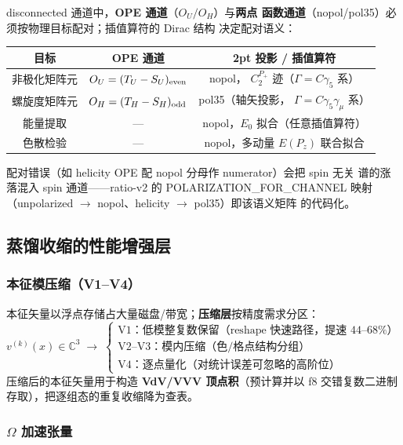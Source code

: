 \documentclass[11pt,a4paper]{ctexart}
\begin{document}
disconnected 通道中，\textbf{OPE 通道}（$O_U/O_H$）与\textbf{两点
函数通道}（nopol/pol35）必须按物理目标配对；插值算符的 Dirac 结构
决定配对语义：
\begin{center}
\small
\begin{tabular}{c c c}
\toprule
\textbf{目标} & \textbf{OPE 通道} & \textbf{2pt 投影 / 插值算符} \\
\midrule
非极化矩阵元 & $O_U=(T_U-S_U)_{\rm even}$ & nopol，
$C_2^{P_+}$ 迹（$\Gamma=C\gamma_5$ 系） \\
螺旋度矩阵元 & $O_H=(T_H-S_H)_{\rm odd}$ & pol35（轴矢投影，
$\Gamma=C\gamma_5\gamma_\mu$ 系） \\
能量提取 & --- & nopol，$E_0$ 拟合（任意插值算符） \\
色散检验 & --- & nopol，多动量 $E(P_z)$ 联合拟合 \\
\bottomrule
\end{tabular}
\end{center}
配对错误（如 helicity OPE 配 nopol 分母作 numerator）会把 spin 无关
谱的涨落混入 spin 通道——ratio-v2 的 POLARIZATION\_FOR\_CHANNEL
映射（unpolarized $\to$ nopol、helicity $\to$ pol35）即该语义矩阵
的代码化。

\subsection{蒸馏收缩的性能增强层}
\label{sec:compress}

\subsubsection{本征模压缩（V1--V4）}

本征矢量以浮点存储占大量磁盘/带宽；\textbf{压缩层}按精度需求分区：
\begin{equation}
v^{(k)}(x) \in \mathbb C^3
\;\longrightarrow\;
\begin{cases}
\text{V1：低模整复数保留（reshape 快速路径，提速 44--68\%）}\\
\text{V2--V3：模内压缩（色/格点结构分组）}\\
\text{V4：逐点量化（对统计误差可忽略的高阶位）}
\end{cases}
\end{equation}
压缩后的本征矢量用于构造 \textbf{VdV/VVV 顶点积}（预计算并以 f8
交错复数二进制存取），把逐组态的重复收缩降为查表。

\subsubsection{$\Omega$ 加速张量}
\end{document}

